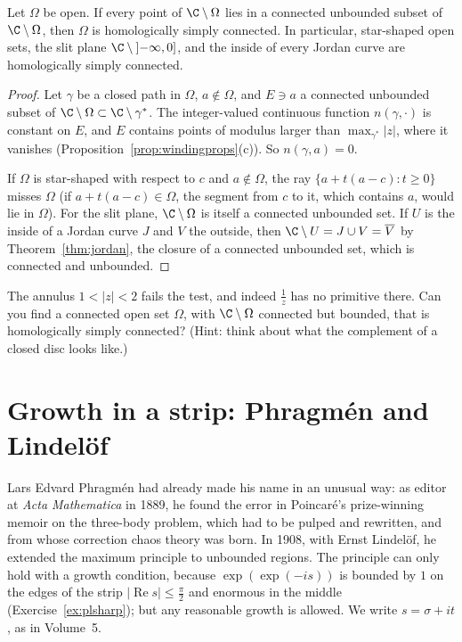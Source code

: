 \begin{proposition}\label{prop:hsccriterion}
Let $\Omega$ be open. If every point of $\C\setminus\Omega$ lies in a connected unbounded subset of $\C\setminus\Omega$, then $\Omega$ is homologically simply connected. In particular, star-shaped open sets,
the slit plane $\C\setminus\left]-\infty,0\right]$, and the inside of every Jordan curve are homologically simply connected.
\end{proposition}
\begin{proof}
Let $\gamma$ be a closed path in $\Omega$, $a\notin\Omega$, and $E\ni a$ a connected unbounded subset of $\C\setminus\Omega\subset\C\setminus\gamma^*$. The integer-valued continuous function $n(\gamma,\cdot)$ is constant
on $E$, and $E$ contains points of modulus larger than $\max_{\gamma^*}|z|$, where it vanishes (Proposition~\ref{prop:windingprops}(c)). So $n(\gamma,a)=0$.

If $\Omega$ is star-shaped with respect to $c$ and $a\notin\Omega$, the ray $\{a+t(a-c):t\ge0\}$ misses $\Omega$ (if $a+t(a-c)\in\Omega$, the segment from $c$ to it, which contains $a$, would lie in $\Omega$). For the
slit plane, $\C\setminus\Omega$ is itself a connected unbounded set. If $U$ is the inside of a Jordan curve $J$ and $V$ the outside, then $\C\setminus U=J\cup V=\overline V$ by Theorem~\ref{thm:jordan}, the
closure of a connected unbounded set, which is connected and unbounded.
\end{proof}

\begin{think}
The annulus $1<|z|<2$ fails the test, and indeed $\frac1z$ has no primitive there. Can you find a connected open set $\Omega$, with $\C\setminus\Omega$ connected but bounded, that is
homologically simply connected? (Hint: think about what the complement of a closed disc looks like.)
\end{think}

\section{Growth in a strip: Phragm\'en and Lindel\"of}

Lars Edvard Phragm\'en had already made his name in an unusual way: as editor at \emph{Acta Mathematica} in 1889, he found the error in Poincar\'e's prize-winning memoir on the three-body problem,
which had to be pulped and rewritten, and from whose correction chaos theory was born. In 1908, with Ernst Lindel\"of, he extended the maximum principle to unbounded regions. The principle can only
hold with a growth condition, because $\exp(\exp(-is))$ is bounded by $1$ on the edges of the strip $|\operatorname{Re}s|\le\frac\pi2$ and enormous in the middle (Exercise~\ref{ex:plsharp}); but any reasonable growth
is allowed. We write $s=\sigma+it$, as in Volume~5.

